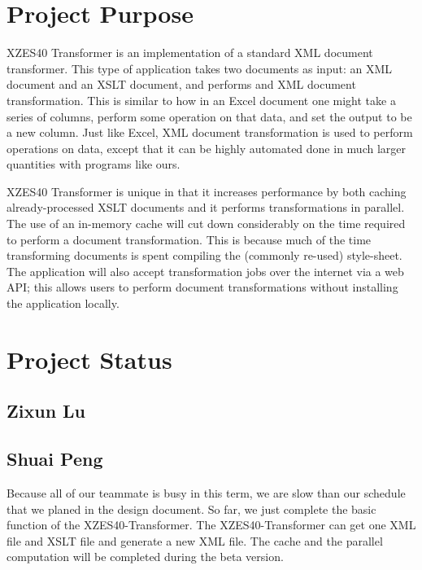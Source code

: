 \section{Project Purpose}

XZES40 Transformer is an implementation of a standard XML document transformer.
This type of application takes two documents as input: an XML document and an XSLT document, and performs and XML document transformation.
This is similar to how in an Excel document one might take a series of columns, perform some operation on that data, and set the output to be a new column.
Just like Excel, XML document transformation is used to perform operations on data, except that it can be highly automated done in much larger quantities with programs like ours.

XZES40 Transformer is unique in that it increases performance by both caching already-processed XSLT documents and it performs transformations in parallel.
The use of an in-memory cache will cut down considerably on the time required to perform a document transformation.
This is because much of the time transforming documents is spent compiling the (commonly re-used) style-sheet.
The application will also accept transformation jobs over the internet via a web API; this allows users to perform document transformations without installing the application locally.

\section{Project Status}

\subsection{Zixun Lu}


\subsection{Shuai Peng}

Because all of our teammate is busy in this term, we are slow than our schedule that we planed in the design document. 
So far, we just complete the basic function of the XZES40-Transformer.
The XZES40-Transformer can get one XML file and XSLT file and generate a new XML file.
The cache and the parallel computation will be completed during the beta version.  

